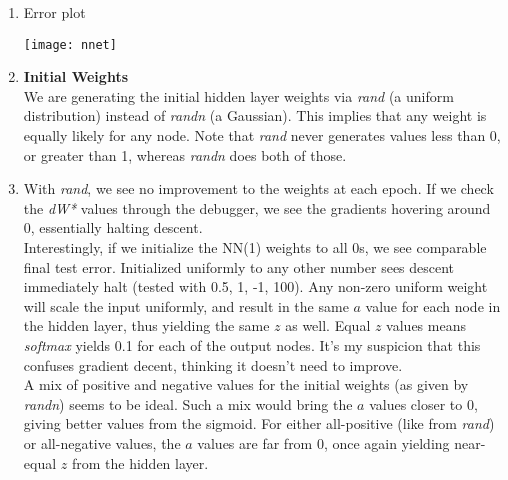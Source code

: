 \documentclass{article}
\begin{document}
\begin{enumerate}
\item Error plot
  \begin{center}
    \texttt{[image: nnet]}
  \end{center}

\item \textbf{Initial Weights}\\
  We are generating the initial hidden layer weights via \emph{rand}
  (a uniform distribution) instead of \emph{randn} (a Gaussian). This
  implies that any weight is equally likely for any node. Note that
  \emph{rand} never generates values less than 0, or greater than 1,
  whereas \emph{randn} does both of those.

\item With \emph{rand}, we see no improvement
  to the weights at each epoch. If we check the \emph{dW*} values through
  the debugger, we see the gradients hovering around
  0, essentially halting descent.\\
  Interestingly, if we initialize the NN(1) weights to all 0s, we see
  comparable final test error. Initialized uniformly to any other number
  sees descent immediately halt (tested with 0.5, 1, -1, 100). Any non-zero
  uniform weight will scale the input uniformly, and result in the same
  $a$ value for each node in the hidden layer, thus yielding the same $z$
  as well. Equal $z$ values means \emph{softmax} yields 0.1 for each of
  the output nodes. It's my suspicion that this confuses gradient decent,
  thinking it doesn't need to improve.\\
  A mix of positive and negative values for the initial weights (as given
  by \emph{randn}) seems to be ideal. Such a mix would bring the $a$ values
  closer to 0, giving better values from the sigmoid. For either all-positive
  (like from \emph{rand}) or all-negative values, the $a$ values are far
  from 0, once again yielding near-equal $z$ from the hidden layer.
\end{enumerate}
\end{document}
